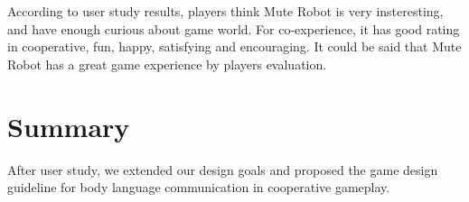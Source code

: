 \documentclass{sigchi}
\begin{document}

According to user study results, players think Mute Robot is very insteresting, and have enough curious about game world. For co-experience, it has good rating in cooperative, fun, happy, satisfying and encouraging. It could be said that Mute Robot has a great game experience by players evaluation. 


\section{Summary}

After user study, we extended our design goals and proposed the game design guideline for body language communication in cooperative gameplay.
\end{document}
